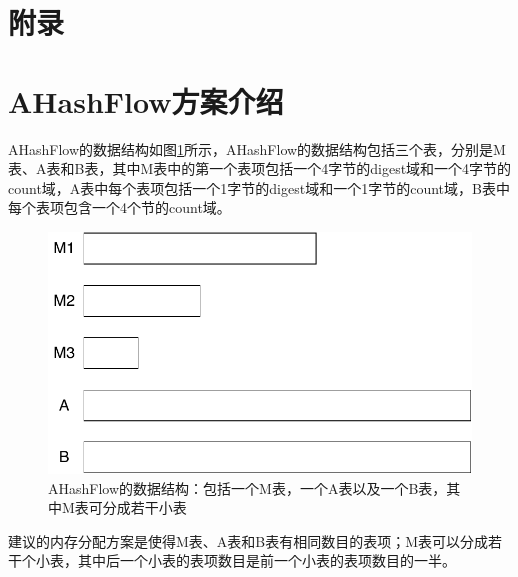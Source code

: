 \documentclass{article}
\begin{document}
\appendix
\section*{附录}
\section{AHashFlow方案介绍}
AHashFlow的数据结构如图\ref{fig:ahashflow}所示，AHashFlow的数据结构包括三个表，分别是M表、A表和B表，其中M表中的第一个表项包括一个4字节的digest域和一个4字节的count域，A表中每个表项包括一个1字节的digest域和一个1字节的count域，B表中每个表项包含一个4个节的count域。
\begin{figure}[ht!]
	\centering
	\includegraphics[width=0.7\linewidth]{./figures/AHashFlowDataStructure/AHashFlow}
	\caption{AHashFlow的数据结构：包括一个M表，一个A表以及一个B表，其中M表可分成若干小表}
	\label{fig:ahashflow}
\end{figure}

建议的内存分配方案是使得M表、A表和B表有相同数目的表项；M表可以分成若干个小表，其中后一个小表的表项数目是前一个小表的表项数目的一半。



\begin{algorithm}[ht!]
	\caption{$promote(idx, digest, cnt)$}
	\label{alg: promote}
	\begin{algorithmic}[1]
	\end{algorithmic}
\end{algorithm}

\begin{algorithm}[ht!]
	\caption{$reset(idx)$}
	\label{alg: reset}
	\begin{algorithmic}[1]
	\end{algorithmic}
\end{algorithm}
\end{document}
